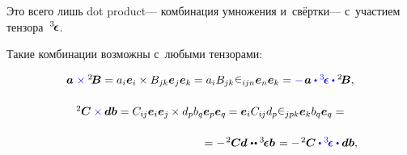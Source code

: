 \begin{otherlanguage}{russian}
\vspace{-0.1em} \noindent Это всего лишь dot product\:--- комбинация умножения и~свёртки\:--- с~участием тензора~${^3\hspace{-0.25ex}\bm{\epsilon}}\hspace{.05ex}$.

Такие комбинации возможны с~любыми тензорами:

\nopagebreak\vspace{-0.1em}\begin{equation*}
\begin{array}{c}
\bm{a} \hspace{.1ex} \mathcolor{blue}{\times} {^2\hspace{-0.16em}\bm{B}} = a_i \bm{e}_i \times B_{jk} \bm{e}_j \bm{e}_k \hspace{-0.1ex} = \tikzmark{BeginVectorCrossTensor} a_i B_{jk} \hspace{.1ex} \levicivita_{i\hspace{-0.1ex}jn} \tikzmark{EndVectorCrossTensor} \bm{e}_n \bm{e}_k = \mathcolor{blue}{-} \hspace{.2ex} \bm{a} \mathcolor{blue}{\dotp \levicivitatensor \dotp} {^2\!\bm{B}} ,
\\[1.6em]
%
{^2\hspace{-0.05ex}\bm{C}} \mathcolor{blue}{\times} \hspace{-0.1ex} \bm{d} \bm{b} = C_{i\hspace{-0.1ex}j} \bm{e}_i \bm{e}_j \hspace{-0.1ex} \times d_p b_q \bm{e}_p \bm{e}_q \hspace{-0.1ex} = \bm{e}_i C_{i\hspace{-0.1ex}j} d_p \tikzmark{BeginTensorCrossTensor} \levicivita_{jpk} \tikzmark{EndTensorCrossTensor} \bm{e}_k b_q \bm{e}_q =
\\[1.6em]
\hspace{12.5em} =
- \hspace{.2ex} {^2\hspace{-0.05ex}\bm{C}} \hspace{-0.1ex} \bm{d} \hspace{0.12ex} \dotdotp \levicivitatensor \bm{b} \hspace{0.2ex} =
\mathcolor{blue}{-} \hspace{.2ex} {^2\hspace{-0.05ex}\bm{C}} \mathcolor{blue}{\dotp \levicivitatensor \dotp} \bm{d} \bm{b},\\
\end{array}
\end{equation*}%
%

\end{otherlanguage}
